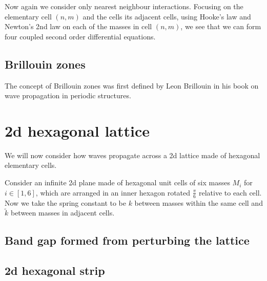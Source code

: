 Now again we consider only nearest neighbour interactions. Focusing on the
elementary cell $(n,m)$ and the cells its adjacent cells, using Hooke's law and
Newton's 2nd law on each of the masses in cell $(n,m)$, we see that we can form
four coupled second order differential equations.

\subsection{Brillouin zones}
The concept of Brillouin zones was first defined by Leon Brillouin in his book
on wave propagation in periodic structures.\cite{brillouin}

\section{2d hexagonal lattice}
We will now consider how waves propagate across a 2d lattice made of hexagonal elementary cells. 

Consider an infinite 2d plane made of hexagonal unit cells of six masses $M_i$
for $i\in\left[1,6\right]$, which are arranged in an inner hexagon rotated
$\frac{\pi}{6}$ relative to each cell. Now we take the spring constant to be $k$
between masses within the same cell and $\tilde{k}$ between masses in adjacent
cells.

\subsection{Band gap formed from perturbing the lattice}

\subsection{2d hexagonal strip}
